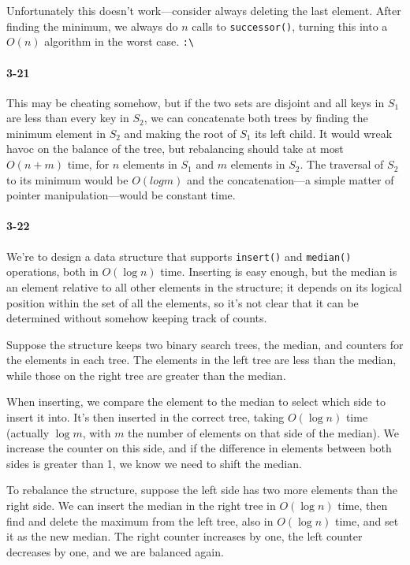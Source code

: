 \documentclass{report}
\begin{document}
Unfortunately this doesn't work---consider always deleting the last element. After finding the minimum, we always do $n$ calls to \lstinline!successor()!, turning this into a $O(n)$ algorithm in the worst case. \lstinline!:\!

\paragraph{3-21} This may be cheating somehow, but if the two sets are disjoint and all keys in $S_1$ are less than every key in $S_2$, we can concatenate both trees by finding the minimum element in $S_2$ and making the root of $S_1$ its left child. It would wreak havoc on the balance of the tree, but rebalancing should take at most $O(n+m)$ time, for $n$ elements in $S_1$ and $m$ elements in $S_2$. The traversal of $S_2$ to its minimum would be $O(log m)$ and the concatenation---a simple matter of pointer manipulation---would be constant time.

\paragraph{3-22} We're to design a data structure that supports \lstinline!insert()! and \lstinline!median()! operations, both in $O(\log n)$ time. Inserting is easy enough, but the median is an element relative to all other elements in the structure; it depends on its logical position within the set of all the elements, so it's not clear that it can be determined without somehow keeping track of counts.

Suppose the structure keeps two binary search trees, the median, and counters for the elements in each tree. The elements in the left tree are less than the median, while those on the right tree are greater than the median.

When inserting, we compare the element to the median to select which side to insert it into. It's then inserted in the correct tree, taking $O(\log n)$ time (actually $\log m$, with $m$ the number of elements on that side of the median). We increase the counter on this side, and if the difference in elements between both sides is greater than 1, we know we need to shift the median.

To rebalance the structure, suppose the left side has two more elements than the right side. We can insert the median in the right tree in $O(\log n)$ time, then find and delete the maximum from the left tree, also in $O(\log n)$ time, and set it as the new median. The right counter increases by one, the left counter decreases by one, and we are balanced again.
\end{document}
